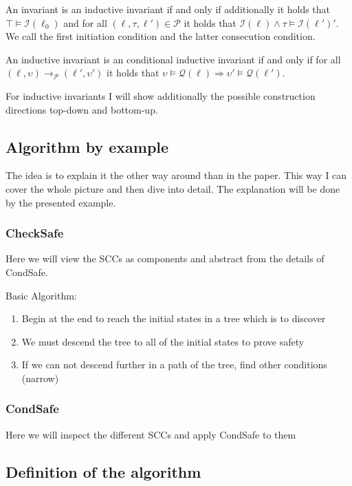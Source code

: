 \documentclass[12pt]{scrartcl}
\begin{document}
An invariant is an inductive invariant if and only if additionally it holds that $\top \models \mathcal{I}(\ell_0)$ and for all $(\ell, \tau, \ell') \in \mathcal{P}$ it holds that $\mathcal{I}(\ell) \wedge \tau \models \mathcal{I}(\ell')'$. We call the first initiation condition and the latter consecution condition.

An inductive invariant is an conditional inductive invariant if and only if for all $(\ell, \upsilon) \rightarrow_\mathcal{P} (\ell', \upsilon')$ it holds that $\upsilon \models \mathcal{Q}(\ell) \Rightarrow \upsilon' \models \mathcal{Q}(\ell')$.

For inductive invariants I will show additionally the possible construction directions top-down and bottom-up.

\subsection{Algorithm by example}

The idea is to explain it the other way around than in the paper.
This way I can cover the whole picture and then dive into detail.
The explanation will be done by the presented example.

\subsubsection{CheckSafe}

Here we will view the SCCs as components and abstract from the details of CondSafe.

Basic Algorithm:

\begin{enumerate}
  \item Begin at the end to reach the initial states in a tree which is to discover
  \item We must descend the tree to all of the initial states to prove safety
  \item If we can not descend further in a path of the tree, find other conditions (narrow)
\end{enumerate}

\subsubsection{CondSafe}

Here we will inspect the different SCCs and apply CondSafe to them

\subsection{Definition of the algorithm}
\end{document}
